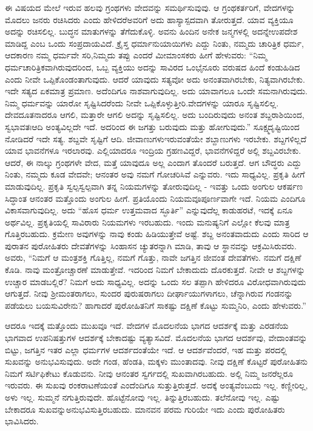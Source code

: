 ಈ ವಿಷಯದ ಮೇಲೆ ಇರುವ ಹಲವು ಗ್ರಂಥಗಳು ವೇದವನ್ನು ಸಮರ್ಥಿಸುವುವು. ಆ ಗ್ರಂಥಕರ್ತರಿಗೆ, ವೇದಗಳನ್ನು ಮೊದಲು ಜನರು ರಚಿಸಿದರು ಎಂದು ಹೇಳಿದರೆ\break ಅವರಿಗೆ ಅದು ಹಾಸ್ಯಾಸ್ಪದವಾಗಿ ತೋರುತ್ತದೆ. ಯಾವ ವ್ಯಕ್ತಿಯೂ ಅದನ್ನು ರಚಿಸಲಿಲ್ಲ. ಬುದ್ಧನ ಮಾತುಗಳನ್ನು ತೆಗೆದುಕೊಳ್ಳಿ. ಅವನು ಹಿಂದಿನ ಅನೇಕ ಜನ್ಮಗಳಲ್ಲಿ ಅದನ್ನೇ\break ಉಪದೇಶ ಮಾಡಿದ್ದ ಎಂಬ ಒಂದು ಸಂಪ್ರದಾಯವಿದೆ. ಕ್ರೈಸ್ತ ಧರ್ಮಾನುಯಾಯಿಗಳು ಎದ್ದು ನಿಂತು, ನಮ್ಮದು ಚಾರಿತ್ರಿಕ ಧರ್ಮ, ಆದಕಾರಣ ನಮ್ಮ ಧರ್ಮವೇ ಸರಿ,\break ನಿಮ್ಮದು ತಪ್ಪು ಎಂದರೆ ಮೀಮಾಂಸಕರು ಹೀಗೆ ಹೇಳುವರು: “ನಿಮ್ಮ ಧರ್ಮ\break ಚಾರಿತ್ರಿಕವಾಗಿರುವುದರಿಂದ, ಒಬ್ಬ ವ್ಯಕ್ತಿಯು ಅದನ್ನು ಸಾವಿರದ ಒಂಭೈನೂರು ವರುಷದ ಹಿಂದೆ ಕಂಡುಹಿಡಿದ ಎಂದು ನೀವೇ ಒಪ್ಪಿಕೊಂಡಂತಾಗುವುದು. ಆದರೆ ಯಾವುದು ಸತ್ಯವೋ ಅದು ಅನಂತವಾಗಿರಬೇಕು, ನಿತ್ಯವಾಗಿರಬೇಕು. ಇದೇ ಸತ್ಯದ ಏಕಮಾತ್ರ ಪ್ರಮಾಣ. ಅದೆಂದಿಗೂ ನಾಶವಾಗುವುದಿಲ್ಲ. ಅದು ಯಾವಾಗಲೂ ಒಂದೇ ಸಮನಾಗಿರುವುದು. ನಿಮ್ಮ ಧರ್ಮವನ್ನು ಯಾರೋ ಸೃಷ್ಟಿಸಿದರೆಂದು ನೀವೇ ಒಪ್ಪಿಕೊಳ್ಳುತ್ತೀರಿ.\break ವೇದಗಳನ್ನು ಯಾರೂ ಸೃಷ್ಟಿಸಲಿಲ್ಲ. ದೇವದೂತನಾದರೂ ಆಗಲಿ, ಮತ್ತಾರೇ ಆಗಲಿ ಅದನ್ನು ಸೃಷ್ಟಿಸಲಿಲ್ಲ. ಅದು ಬಂದಿರುವುದು ಅನಂತ ಶಬ್ದರಾಶಿಯಿಂದ, ಸ್ವಭಾವತಃ\break ಆದಿ ಅಂತ್ಯವಿಲ್ಲದೇ ಇದೆ. ಅದರಿಂದ ಈ ಜಗತ್ತು ಬರುವುದು ಮತ್ತು ಹೋಗುವುದು.” ಸೂಕ್ಷ್ಮದೃಷ್ಟಿಯಿಂದ ನೋಡಿದರೆ ಇದೇ ಸತ್ಯ. ಶಬ್ದವೇ ಸೃಷ್ಟಿಗೆ ಆದಿ. ಜೀವಾಣುಗಳು\break ಇರುವಂತೆಯೇ ಶಬ್ದಾಣುಗಳು ಇರಬೇಕು. ಶಬ್ದಗಳಿಲ್ಲದೆ ಯಾವ ಭಾವನೆಗಳೂ ಇರಲಾರವು. ಎಲ್ಲಿಯಾದರೂ ಇಂದ್ರಿಯ ಗ್ರಹಣವಿದ್ದರೆ, ಭಾವನೆಗಳಿದ್ದರೆ ಅಲ್ಲಿ ಶಬ್ದವಿರಬೇಕು. ಆದರೆ, ಈ ನಾಲ್ಕು ಗ್ರಂಥಗಳೇ ವೇದ, ಮತ್ತೆ ಯಾವುದೂ ಅಲ್ಲ ಎಂದಾಗ ತೊಂದರೆ ಬರುತ್ತದೆ. ಆಗ ಬೌದ್ಧರು ಎದ್ದು ನಿಂತು, ನಮ್ಮದು ಕೂಡ ವೇದವೇ; ಆನಂತರ ಅವು ನಮಗೆ ಗೋಚರಿಸಿವೆ ಎನ್ನುವರು. ಇದು ಸಾಧ್ಯವಿಲ್ಲ. ಪ್ರಕೃತಿ ಹೀಗೆ ಮಾಡುವುದಿಲ್ಲ. ಪ್ರಕೃತಿ ಸ್ವಲ್ಪಸ್ವಲ್ಪವಾಗಿ ತನ್ನ ನಿಯಮಗಳನ್ನು ತೋರುವುದಿಲ್ಲ - ಇವತ್ತು ಒಂದು ಅಂಗುಲ ಆಕರ್ಷಣ ಸಿದ್ಧಾಂತ ಆನಂತರ ಮತ್ತೊಂದು ಅಂಗುಲ ಹೀಗೆ. ಪ್ರತಿಯೊಂದು ನಿಯಮವೂ\break ಪೂರ್ಣವಾಗೇ ಇದೆ. ನಿಯಮ ಎಂದಿಗೂ ವಿಕಾಸವಾಗುವುದಿಲ್ಲ. ಅದು “ಹೊಸ ಧರ್ಮ ಉತ್ತಮವಾದ ಸ್ಛೂರ್ತಿ” ಎನ್ನುವುದೆಲ್ಲ ಕಾಡುಹರಟೆ, ಇದಕ್ಕೆ ಏನೂ ಅರ್ಥವಿಲ್ಲ. ಪ್ರಕೃತಿಯಲ್ಲಿ ಸಾವಿರಾರು ನಿಯಮಗಳು ಇರಬಹುದು. ಇಂದು ಮನುಷ್ಯನಿಗೆ ಎಲ್ಲೋ ಕೆಲವು ಮಾತ್ರ ಗೊತ್ತಿರಬಹುದು. ಕ್ರಮೇಣ ಅವುಗಳನ್ನು ನಾವು ಕಂಡು ಹಿಡಿಯುತ್ತೇವೆ ಅಷ್ಟೆ. ಶಬ್ದ ಅನಂತವಾದುದು ಎಂದು ಸಾರಿದ ಆ ಪುರಾತನ ಪುರೋಹಿತರು ದೇವತೆಗಳನ್ನು ಸಿಂಹಾಸನ ಚ್ಯುತರನ್ನಾಗಿ ಮಾಡಿ, ತಾವು ಆ ಸ್ಥಾನವನ್ನು ಆಕ್ರಮಿಸಿರುವರು. ಅವರು, “ನಿಮಗೆ ಆ ಮಂತ್ರಶಕ್ತಿ ಗೊತ್ತಿಲ್ಲ, ನಮಗೆ ಗೊತ್ತು, ನಾವೇ ಜಗತ್ತಿನ ಜೀವಂತ ದೇವತೆಗಳು. ನಮಗೆ ದಕ್ಷಿಣೆ ಕೊಡಿ. ನಾವು ಮಂತ್ರೋಚ್ಚಾರಣೆ ಮಾಡುತ್ತೇವೆ. ಇದರಿಂದ ನಿಮಗೆ ಬೇಕಾದುದು ದೊರಕುತ್ತದೆ. ನೀವೇ ಆ ಶಬ್ದಗಳನ್ನು ಉಚ್ಚಾರ ಮಾಡಬಲ್ಲಿರೆ? ನಿಮಗೆ ಅದು ಸಾಧ್ಯವಿಲ್ಲ. ಅದನ್ನು ಒಂದು ಸಲ ತಪ್ಪಾಗಿ ಹೇಳಿದರೂ ವಿರೋಧವಾಗಿರುವುದು ಆಗುತ್ತದೆ. ನೀವು ಶ‍್ರೀಮಂತರಾಗಲು, ಸುಂದರ ಪುರುಷರಾಗಲು ದೀರ್ಘಾಯುಗಳಾಗಲು, ಚೆನ್ನಾಗಿರುವ ಗಂಡನನ್ನು ಪಡೆಯಲು ಬಯಸುವಿರೇನು? ಹಾಗಾದರೆ ಪುರೋಹಿತನಿಗೆ ಸಾಕಷ್ಟು ದಕ್ಷಿಣೆ ಕೊಟ್ಟು ಸುಮ್ಮನಿರಿ, ಎಂದು ಹೇಳುವರು.”

ಆದರೂ ಇದಕ್ಕೆ ಮತ್ತೊಂದು ಮುಖವೂ ಇದೆ. ವೇದಗಳ ಮೊದಲನೆಯ ಭಾಗದ ಆದರ್ಶಕ್ಕೆ ಮತ್ತು ಎರಡನೆಯ ಭಾಗವಾದ ಉಪನಿಷತ್ತುಗಳ ಆದರ್ಶಕ್ಕೆ ಬೇಕಾದಷ್ಟು ವ್ಯತ್ಯಾಸವಿದೆ. ಮೊದಲನೆಯ ಭಾಗದ ಆದರ್ಶವು, ವೇದಾಂತವನ್ನು ಬಿಟ್ಟು, ಜಗತ್ತಿನ ಇತರ ಎಲ್ಲಾ ಧರ್ಮಗಳ ಆದರ್ಶದಂತೆಯೇ ಇದೆ. ಆ ಆದರ್ಶವೆಂದರೆ, ಇಹ ಮತ್ತು ಪರದಲ್ಲಿ ಸುಖವನ್ನು ಅನುಭವಿಸುವುದು. ಅದೇ ಗಂಡ, ಹೆಂಡತಿ, ಮಕ್ಕಳು ಮುಂತಾದವು. ನೀವು ದಕ್ಷಿಣೆ ಕೊಟ್ಟರೆ ಪುರೋಹಿತನು ನಿಮಗೆ ಸರ್ಟಿಫಿಕೇಟು ಕೊಡುವನು. ನೀವು ಆನಂತರ ಸ್ವರ್ಗದಲ್ಲಿ ಸುಖವಾಗಿರಬಹುದು. ಅಲ್ಲಿ ನಿಮ್ಮ ಜನರೆಲ್ಲರೂ ಇರುವರು. ಈ ಸುಖವು ರಂಕರಾಟಣೆಯಂತೆ  ಎಂದೆಂದಿಗೂ ಸುತ್ತುತ್ತಿರುತ್ತದೆ. ಅದಕ್ಕೆ ಅಂತ್ಯವೆಂಬುದು ಇಲ್ಲ. ಕಣ್ಣೀರಿಲ್ಲ, ಅಳು ಇಲ್ಲ. ಸುಮ್ಮನೆ ನಗುತ್ತಿರುವುದೇ. ಹೊಟ್ಟೆನೋವು ಇಲ್ಲ. ತಿನ್ನುತ್ತಿರಬಹುದು. ತಲೆನೋವು ಇಲ್ಲ. ಎಷ್ಟು ಬೇಕಾದರೂ ಸುಖವನ್ನು\break ಅನುಭವಿಸುತ್ತಿರಬಹುದು. ಮಾನವನ ಪರಮ ಗುರಿಯೇ ಇದು ಎಂದು ಪುರೋಹಿತರು ಭಾವಿಸಿದರು.

